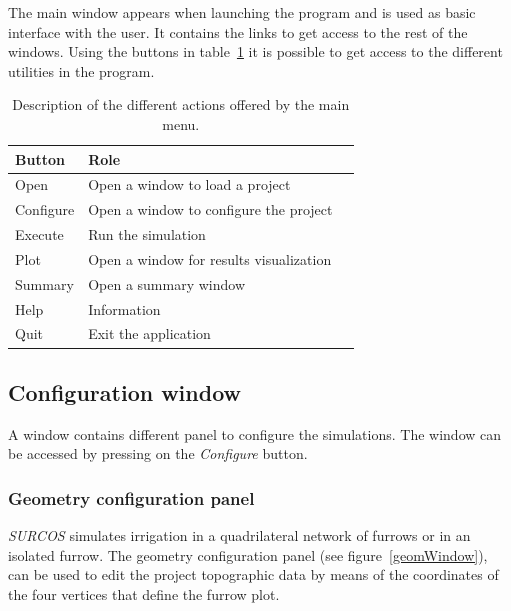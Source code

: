 \documentclass[review,authoryear]{elsarticle}
\begin{document}
The main window appears when launching the program and is used as basic
interface with the user. It contains the links to get access to the rest of the
windows. Using the buttons in table~\ref{mainWindowIcons} it is possible to get
access to the different utilities in the program.

\newlength{\UNIT}
\setlength{\UNIT}{0.0107cm}


\begin{table}[!ht]\footnotesize
\caption{Description of the different actions offered by the main menu.}\label{mainWindowIcons}
\begin{center}
\begin{tabular}{llr}
\hline
Button & Role \\
\hline
Open & Open a window to load a project \\
Configure & Open a window to configure the project \\
Execute & Run the simulation \\
Plot & Open a window for results visualization \\
Summary & Open a summary window \\
Help & Information \\
Quit & Exit the application \\
\hline
\end{tabular}
\end{center}
\end{table}

\subsection{Configuration window}

A window contains different panel to configure the simulations. The window can be accessed by pressing on the \emph{Configure} button.

\subsubsection{Geometry configuration panel}

\emph{SURCOS} simulates irrigation in a quadrilateral network of
furrows or in an isolated furrow. The geometry configuration panel (see
figure~\ref{geomWindow}), can be used to edit the project topographic data by
means of the coordinates of the four vertices that define the furrow plot.
\end{document}
